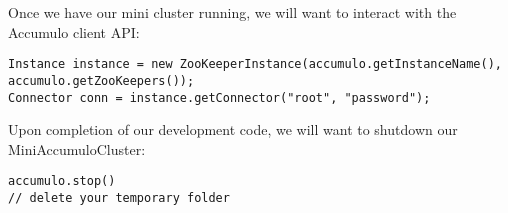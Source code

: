 Once we have our mini cluster running, we will want to interact with the Accumulo client API:

\small
\begin{verbatim}
Instance instance = new ZooKeeperInstance(accumulo.getInstanceName(), accumulo.getZooKeepers());
Connector conn = instance.getConnector("root", "password");
\end{verbatim}
\normalsize

Upon completion of our development code, we will want to shutdown our MiniAccumuloCluster:

\small
\begin{verbatim}
accumulo.stop()
// delete your temporary folder
\end{verbatim}
\normalsize

